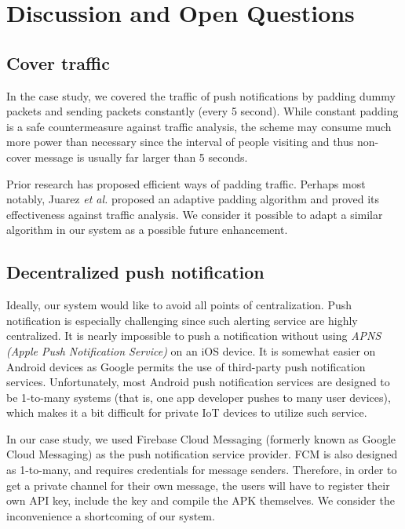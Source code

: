 \chapter{Discussion and Open Questions}

\section{Cover traffic}
\label{sec:traffic_cover}
In the case study, we covered the traffic of push notifications by padding dummy packets and sending packets constantly (every 5 second). While constant padding is  a safe countermeasure against traffic analysis, the scheme may consume much more power than necessary since the interval of people visiting and thus non-cover message is usually far larger than 5 seconds. 

Prior research has proposed efficient ways of padding traffic. Perhaps most notably, Juarez \textit{et al.} \cite{juarez2016toward} proposed an adaptive padding algorithm and proved its effectiveness against traffic analysis. We consider it possible to adapt a similar algorithm in our system as a possible future enhancement.

\section{Decentralized push notification}
\label{sec:decentralized_push}
Ideally, our system would like to avoid all points of centralization. Push notification is especially challenging since such alerting service are highly centralized. It is nearly impossible to push a notification without using \textit{APNS (Apple Push Notification Service)} on an iOS device. It is somewhat easier on Android devices as Google permits the use of third-party push notification services. Unfortunately, most Android push notification services are designed to be 1-to-many systems (that is, one app developer pushes to many user devices), which makes it a bit difficult for private IoT devices to utilize such service.

In our case study, we used Firebase Cloud Messaging (formerly known as Google Cloud Messaging) as the push notification service provider. FCM is also designed as 1-to-many, and requires credentials for message senders. Therefore, in order to get a private channel for their own message, the users will have to register their own API key, include the key and compile the APK themselves. We consider the inconvenience a shortcoming of our system.

